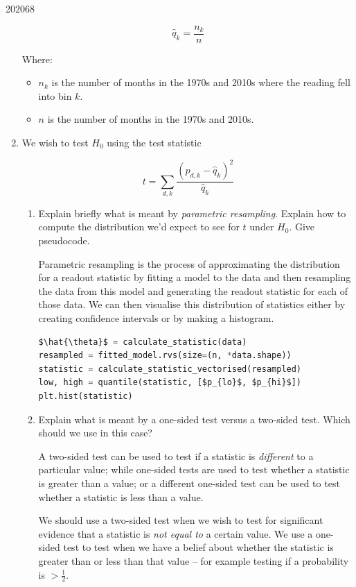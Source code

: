 \documentclass[10pt,\jkfside,a4paper]{article}
\begin{document}
\begin{examquestion}{2020}{6}{8}
\begin{enumerate}[label=(\alph*)]
\[
\hat{q}_k = \frac{n_k}{n}
\]

Where:

\begin{itemize}

\item $n_k$ is the number of months in the 1970s and 2010s where the reading
fell into bin $k$.

\item $n$ is the number of months in the 1970s and 2010s.

\end{itemize}

\item We wish to test $H_0$ using the test statistic

\[
t = \sum_{d,k}  \frac{\left( \hat{p}_{d,k} - \hat{q}_k \right)^2}{\hat{q}_k}
\]

\begin{enumerate}[label=(\roman*)]

\item Explain briefly what is meant by \textit{parametric resampling}.
Explain how to compute the distribution we'd expect to see for $t$ under
$H_0$. Give pseudocode.

Parametric resampling is the process of approximating the distribution for a
readout statistic by fitting a model to the data and then resampling the
data from this model and generating the readout statistic for each of those
data. We can then visualise this distribution of statistics either by
creating confidence intervals or by making a histogram.

\begin{lstlisting}[language=Python, mathescape=true]
$\hat{\theta}$ = calculate_statistic(data)
resampled = fitted_model.rvs(size=(n, *data.shape))
statistic = calculate_statistic_vectorised(resampled)
low, high = quantile(statistic, [$p_{lo}$, $p_{hi}$])
plt.hist(statistic)
\end{lstlisting}

\item Explain what is meant by a one-sided test versus a two-sided test.
Which should we use in this case?

A two-sided test can be used to test if a statistic is \textit{different} to
a particular value; while one-sided tests are used to test whether a
statistic is greater than a value; or a different one-sided test can be used
to test whether a statistic is less than a value.

We should use a two-sided test when we wish to test for significant evidence
that a statistic is \textit{not equal to} a certain value. We use a
one-sided test to test when we have a belief about whether the statistic is
greater than or less than that value -- for example testing if a probability
is $> \frac{1}{2}$.


\end{enumerate}
\end{enumerate}
\end{examquestion}
\end{document}
